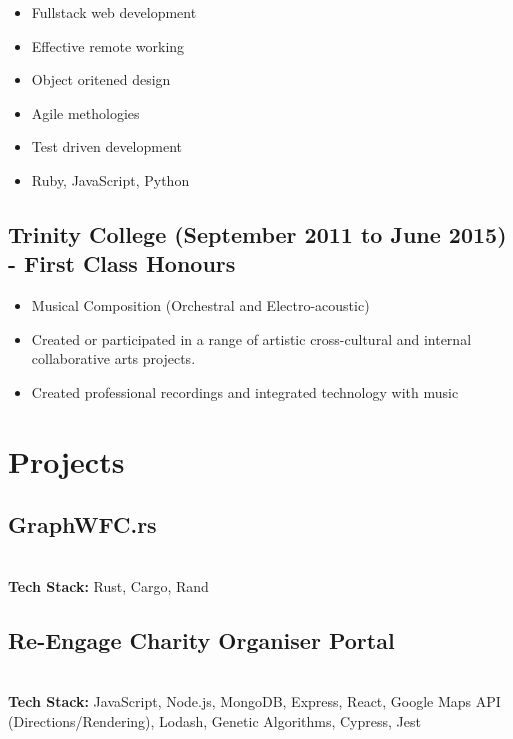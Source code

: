 \documentclass[12pt]{IEEEtran}
\begin{document}
\begin{itemize}
\item Fullstack web development
\item Effective remote working
\item Object oritened design
\item Agile methologies
\item Test driven development
\item Ruby, JavaScript, Python
\end{itemize}

\subsection*{Trinity College (September 2011 to June 2015) - First Class Honours}
\begin{itemize}
\item Musical Composition (Orchestral and Electro-acoustic)
\item Created or participated in a range of artistic cross-cultural and internal collaborative arts projects.
\item Created professional recordings and integrated technology with music
\end{itemize}

\vskip 1in
\lipsum[1-2]
\vfill\null
\columnbreak
\section*{Projects}
\subsection*{GraphWFC.rs}
 \\[5pt]
\textbf{Tech Stack:} Rust, Cargo, Rand

\subsection*{Re-Engage Charity Organiser Portal}
 \\[5pt]
\textbf{Tech Stack:} JavaScript, Node.js, MongoDB, Express, React, Google Maps API (Directions/Rendering), Lodash, Genetic Algorithms, Cypress, Jest
\end{document}
